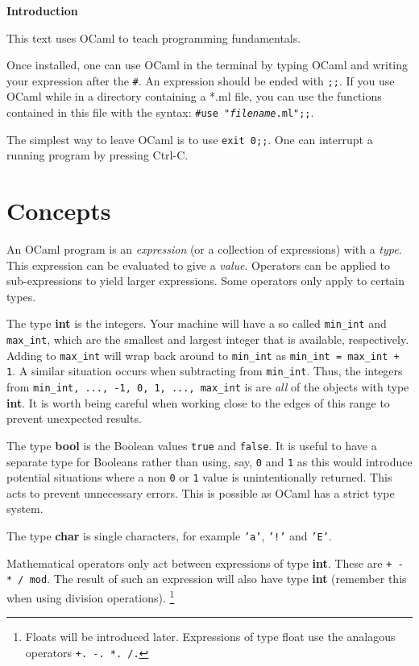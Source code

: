 \documentclass[12pt]{article}
\begin{document}
\begin{center}\LARGE\bf
    Introduction
\end{center}

This text uses OCaml to teach programming fundamentals.

Once installed, one can use OCaml in the terminal by typing OCaml and writing your expression
after the \texttt{\#}. An expression should be ended with \texttt{;;}. If you use OCaml while in a
directory containing a *.ml file, you can use the functions contained in this file with the syntax:
\texttt{\#use "\textit{filename}.ml";;}.

The simplest way to leave OCaml is to use \texttt{exit 0;;}. One can interrupt a running program by
pressing Ctrl-C.

\section{Concepts}
An OCaml program is an \textit{expression} (or a collection of expressions) with a \textit{type}.
This expression can be evaluated to give a \textit{value}. Operators can be applied to sub-expressions
to yield larger expressions. Some operators only apply to certain types.

The type \textbf{int} is the integers. Your machine will have a so called \texttt{min\_int} and \texttt{max\_int}, which
are the smallest and largest integer that is available, respectively. Adding to \texttt{max\_int} will
wrap back around to \texttt{min\_int} as \texttt{min\_int = max\_int + 1}. A similar situation occurs when
subtracting from \texttt{min\_int}. Thus, the integers from \texttt{min\_int, ..., -1, 0, 1, ..., max\_int} is
are \textit{all} of the objects with type \textbf{int}. It is worth being careful when working close to the edges of this range
to prevent unexpected results.

The type \textbf{bool} is the Boolean values \texttt{true} and \texttt{false}. It is useful to have
a separate type for Booleans rather than using, say, \texttt{0} and \texttt{1} as this would introduce
potential situations where a non \texttt{0} or \texttt{1} value is unintentionally returned. This acts
to prevent unnecessary errors. This is possible as OCaml has a strict type system.

The type \textbf{char} is single characters, for example \texttt{'a'}, \texttt{'!'} and \texttt{'E'}.

Mathematical operators only act between expressions of type \textbf{int}. These are \texttt{+ - * / mod}.
The result of such an expression will also have type \textbf{int} (remember this when using division operations).
\footnote{Floats will be introduced later. Expressions of type float use the analagous operators \texttt{+. -. *. /.}}
\end{document}

